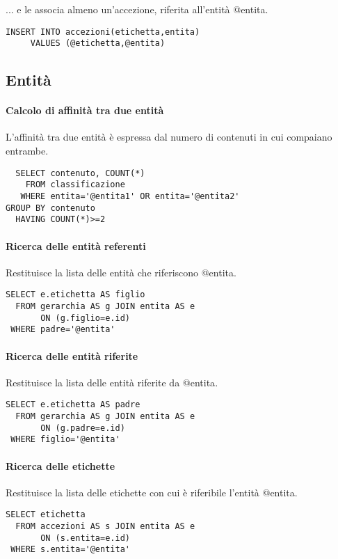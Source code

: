... e le associa almeno un'accezione, riferita all'entità \textsf{@entita}.

\begin{verbatim}
INSERT INTO accezioni(etichetta,entita)
     VALUES (@etichetta,@entita)
\end{verbatim}
	
\subsection*{Entità}
	
\paragraph{Calcolo di affinità tra due entità}
L'affinità tra due entità è espressa dal numero di contenuti in cui compaiano entrambe.
\begin{verbatim}
  SELECT contenuto, COUNT(*)
    FROM classificazione
   WHERE entita='@entita1' OR entita='@entita2'
GROUP BY contenuto
  HAVING COUNT(*)>=2
\end{verbatim}

\paragraph{Ricerca delle entità referenti}
Restituisce la lista delle entità che riferiscono \textsf{@entita}.
\begin{verbatim}
SELECT e.etichetta AS figlio
  FROM gerarchia AS g JOIN entita AS e
       ON (g.figlio=e.id)
 WHERE padre='@entita'
\end{verbatim}

\paragraph{Ricerca delle entità riferite}
Restituisce la lista delle entità riferite da \textsf{@entita}.
\begin{verbatim}
SELECT e.etichetta AS padre
  FROM gerarchia AS g JOIN entita AS e
       ON (g.padre=e.id)
 WHERE figlio='@entita'
\end{verbatim}

\paragraph{Ricerca delle etichette}
Restituisce la lista delle etichette con cui è riferibile l'entità \textsf{@entita}.
\begin{verbatim}
SELECT etichetta
  FROM accezioni AS s JOIN entita AS e
       ON (s.entita=e.id)
 WHERE s.entita='@entita'
\end{verbatim}

